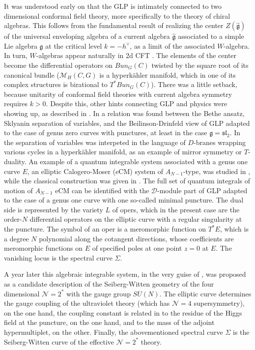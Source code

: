 \documentclass[12pt]{article}
\newcommand\CalD{\mathcal{D}}
\newcommand\CalN{\mathcal{N}}
\newcommand\CalM{\mathcal{M}}
\begin{document}
It was understood early on that the GLP is intimately connected to two dimensional conformal field theory, more specifically to 
the theory of chiral algebras. This follows from the fundamental result of \cite{FF:1992cl} realizing the center 
$Z ({\widehat{\mathfrak{g}}})$ of
the universal enveloping algebra of a current algebra
$\widehat{\mathfrak{g}}$ associated
to a simple Lie algebra $\mathfrak{g}$ at the critical level $k = -h^{\vee}$, 
as a limit of the associated $W$-algebra. In turn, $W$-algebras appear naturally in 2d CFT \cite{ZW}. The elements of the center become the differential operators on $Bun_{G}(C)$ twisted by the square root of its canonical bundle (${\CalM}_{H} (C, G)$ is a hyperk{\"a}hler manifold, which in one of its complex structures is birational to $T^{*}Bun_{G}(C)$). There was a little setback, because unitarity of conformal field theories with current algebra symmetry requires $k > 0$. 
Despite this, other hints connecting GLP and physics were showing up, as described in \cite{Frenkel:2004LP}. In \cite{Feigin:1994in} a relation was found between
the Bethe ansatz, Sklyanin separation of variables, and the Beilinson-Drinfeld view of GLP adapted to the case of
genus zero curves with punctures, at least in the case ${\mathfrak{g}} = {\mathfrak{sl}}_{2}$. 
{}In \cite{Gorsky:1999rb} the separation of variables was interpeted in the language of $D$-branes 
wrapping various cycles in a hyperk{\"a}hler manifold, as an example of mirror symmetry or $T$-duality. 
An example of a quantum integrable system associated with a genus one curve $E$, an elliptic Calogero-Moser (eCM) system of $A_{N-1}$-type, was studied in \cite{Etingof:1993wp}, while
the classical construction was given in  \cite{Gorsky:1994dj}. The full set of quantum integrals of motion of $A_{N-1}$ eCM can be identified with the $\CalD$-module part of GLP adapted to the
case of a genus one curve with one so-called minimal puncture. The dual side is represented by the variety $L$ of opers, 
which in the present case are the order-$N$ differential operators on the elliptic curve with a regular singularity at the puncture. The symbol of an oper is a meromorphic function on $T^{*}E$, which is a degree $N$ polynomial along the cotangent directions, whose coefficients are meromorphic functions on $E$ of specified poles at one point $z=0$ at $E$. The vanishing
locus is the spectral curve $\Sigma$.

A year later this algebraic integrable system, in the very guise of  \cite{Gorsky:1994dj}, 
was proposed \cite{Donagi:1995cf} as a candidate
description of the Seiberg-Witten geometry of the
four dimensional ${\CalN}=2^{*}$ with the gauge group $SU(N)$. The elliptic curve determines the gauge coupling of the
ultraviolet theory (which has ${\CalN}=4$ supersymmetry), on the one hand, 
the coupling constant is related in \cite{Gorsky:1994dj}
to the residue of the Higgs field at the puncture, on the one hand, 
and to the mass of the adjoint hypermultiplet, on the other. Finally, the abovementioned spectral curve $\Sigma$ is the Seiberg-Witten curve of the effective ${\CalN}=2^{*}$ theory. 
\end{document}

